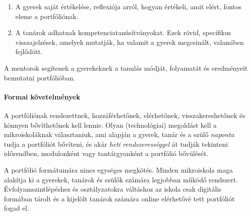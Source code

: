 \begin{enumerate}
      \item A gyerek saját értékelése, reflexiója arról, hogyan értékeli, amit
            elért, fontos eleme a portfóliónak.

      \item A tanárok adhatnak kompetenciatanúsítványokat. Ezek
            rövid,
            specifikus visszajelzések, amelyek mutatják, ha valamit a gyerek
            megcsinált,
            valamiben fejlődött.
\end{enumerate}

A mentorok segítenek a gyerekeknek a tanulás módját, folyamatát és eredményeit
bemutatni
portfólióban.

\paragraph{Formai követelmények}
A portfóliónak rendezettnek, hozzáférhetőnek,
elérhetőnek, visszakereshetőnek és könnyen bővíthetőnek kell lennie. Olyan
(technológiai)
megoldást kell a mikroiskoláknak választaniuk, ami alapján
a gyerek, tanár és a szülő \emph{naponta} tudja a portfóliót bővíteni, és akár
\emph{heti rendszerességgel} át tudják tekinteni időrendben, modulonként vagy
tantárgyanként a portfólió bővülését.

A portfólió formátumára nincs egységes megkötés. Minden mikroiskola maga
alakítja ki a gyerekek, tanárok és szülők számára legjobban működő rendszert.
Évfolyamszintlépéshez és osztályzatokra váltáshoz az iskola csak digitális
formában tárolt és a kijelölt tanárok számára online elérhetővé tett portfóliót
fogad el.